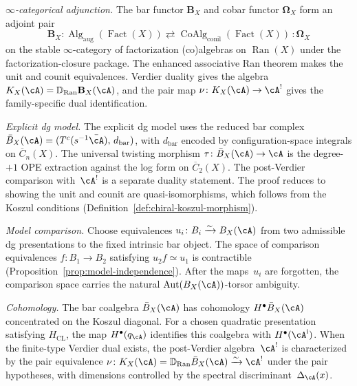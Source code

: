\begin{remark}
\label{rem:theorem-a-model}
\emph{$\infty$-categorical adjunction.}
The bar functor $\mathbf{B}_X$ and cobar functor
$\boldsymbol{\Omega}_X$ form an adjoint pair
\[
\mathbf{B}_X \colon
\operatorname{Alg}_{\mathrm{aug}}(\operatorname{Fact}(X))
\rightleftarrows
\operatorname{CoAlg}_{\mathrm{conil}}(\operatorname{Fact}(X))
\,:\! \boldsymbol{\Omega}_X
\]
on the stable $\infty$-category of factorization (co)algebras on
$\operatorname{Ran}(X)$ under the factorization-closure package.  The
enhanced associative Ran theorem makes the unit and counit
equivalences. Verdier duality gives the algebra
$K_X(\cA)=\mathbb D_{\operatorname{Ran}}\mathbf B_X(\cA)$, and the pair
map $\nu\colon K_X(\cA)\to\cA^!$ gives the family-specific dual
identification.

\emph{Explicit dg model.}
The explicit dg model uses the reduced bar complex
$\bar{B}_X(\cA) = (T^c(s^{-1}\bar{\cA}),\, d_{\mathrm{bar}})$,
with $d_{\mathrm{bar}}$ encoded by configuration-space integrals
on $\overline{C}_n(X)$. The universal twisting morphism
$\tau \colon \bar{B}_X(\cA) \to \cA$ is the degree-$+1$
OPE extraction against the log form on $\overline{C}_2(X)$. The
post-Verdier comparison with~$\cA^!$ is a separate duality statement.
The proof reduces to showing the unit and counit are
quasi-isomorphisms, which follows from the Koszul conditions
(Definition~\ref{def:chiral-koszul-morphism}).

\emph{Model comparison.}
Choose equivalences
$u_i\colon B_i\xrightarrow{\sim}B_X(\cA)$ from two admissible dg
presentations to the fixed intrinsic bar object.  The space of
comparison equivalences $f\colon B_1\to B_2$ satisfying
$u_2f\simeq u_1$ is contractible
(Proposition~\ref{prop:model-independence}).  After the maps~$u_i$ are
forgotten, the comparison space carries the natural
$\operatorname{Aut}(B_X(\cA))$-torsor ambiguity.

\emph{Cohomology.}
The bar coalgebra $\bar{B}_X(\cA)$ has cohomology
$H^\bullet\bar B_X(\cA)$ concentrated on the Koszul diagonal.  For a
chosen quadratic presentation satisfying $H_{\mathrm{CL}}$, the map
$H^\bullet(q_\cA)$ identifies this coalgebra with
$H^\bullet(\cA^{\mathrm i})$. When the finite-type Verdier dual exists,
the post-Verdier algebra~$\cA^!$ is characterized by the pair equivalence
$\nu\colon K_X(\cA)=\mathbb{D}_{\operatorname{Ran}}
\bar{B}_X(\cA)\xrightarrow{\sim}\cA^!$ under the pair hypotheses, with
dimensions controlled by the spectral
discriminant~$\Delta_{\cA}(x)$.


\end{remark}
